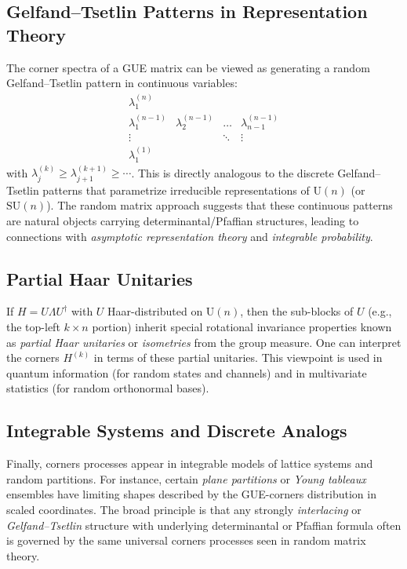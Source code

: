 \documentclass[letterpaper,11pt,oneside,reqno]{article}
\numberwithin{equation}{section}
\theoremstyle{definition}
\begin{document}
\subsection{Gelfand--Tsetlin Patterns in Representation Theory}
The corner spectra of a GUE matrix can be viewed as generating a random Gelfand--Tsetlin pattern in continuous variables:
\[
	\begin{matrix}
	\lambda_1^{(n)} \\
	\lambda_1^{(n-1)} & \lambda_2^{(n-1)} & \dots & \lambda_{n-1}^{(n-1)} \\
	\vdots & & \ddots & \vdots \\
	\lambda_1^{(1)}
	\end{matrix}
\]
with $\lambda_{j}^{(k)}\ge \lambda_{j+1}^{(k+1)}\ge \cdots$. This is directly analogous to the discrete Gelfand--Tsetlin patterns that parametrize irreducible representations of $\mathrm{U}(n)$ (or $\mathrm{SU}(n)$). The random matrix approach suggests that these continuous patterns are natural objects carrying determinantal/Pfaffian structures, leading to connections with \emph{asymptotic representation theory} and \emph{integrable probability}.

\subsection{Partial Haar Unitaries}
If $H=U\Lambda U^\dagger$ with $U$ Haar-distributed on $\mathrm{U}(n)$, then the sub-blocks of $U$ (e.g., the top-left $k\times n$ portion) inherit special rotational invariance properties known as \emph{partial Haar unitaries} or \emph{isometries} from the group measure. One can interpret the corners $H^{(k)}$ in terms of these partial unitaries. This viewpoint is used in quantum information (for random states and channels) and in multivariate statistics (for random orthonormal bases).

\subsection{Integrable Systems and Discrete Analogs}
Finally, corners processes appear in integrable models of lattice systems and random partitions. For instance, certain \emph{plane partitions} or \emph{Young tableaux} ensembles have limiting shapes described by the GUE-corners distribution in scaled coordinates. The broad principle is that any strongly \emph{interlacing} or \emph{Gelfand--Tsetlin} structure with underlying determinantal or Pfaffian formula often is governed by the same universal corners processes seen in random matrix theory.
\end{document}
